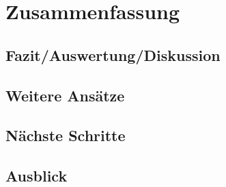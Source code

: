 \chapter{Zusammenfassung}

\section{Fazit/Auswertung/Diskussion}

\section{Weitere Ansätze}

\section{Nächste Schritte}

\section{Ausblick}
